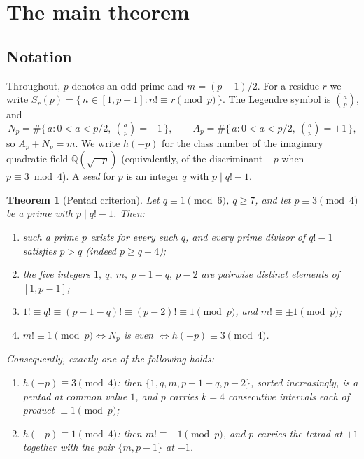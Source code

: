 \documentclass[11pt]{article}
\newtheorem{theorem}{Theorem}[section]
\theoremstyle{definition}
\theoremstyle{remark}
\newcommand{\Q}{\mathbb{Q}}
\newcommand{\legendre}[2]{\left(\tfrac{#1}{#2}\right)}
\begin{document}
\section{The main theorem}\label{sec:main}

\subsection*{Notation}
Throughout, $p$ denotes an odd prime and $m = (p-1)/2$. For a residue $r$ we
write $S_r(p) = \{\, n \in [1, p-1] : n! \equiv r \pmod p \,\}$. The Legendre
symbol is $\legendre{a}{p}$, and
\[
  N_p = \#\{\, a : 0 < a < p/2,\ \legendre{a}{p} = -1 \,\}, \qquad
  A_p = \#\{\, a : 0 < a < p/2,\ \legendre{a}{p} = +1 \,\},
\]
so $A_p + N_p = m$. We write $h(-p)$ for the class number of the imaginary
quadratic field $\Q(\sqrt{-p})$ (equivalently, of the discriminant $-p$ when
$p \equiv 3 \bmod 4$). A \emph{seed} for $p$ is an integer $q$ with
$p \mid q! - 1$.

\begin{theorem}[Pentad criterion]\label{thm:main}
Let $q \equiv 1 \pmod 6$, $q \ge 7$, and let $p \equiv 3 \pmod 4$ be a prime
with $p \mid q! - 1$. Then:
\begin{enumerate}
  \item[(a)] such a prime $p$ exists for every such $q$, and every prime
    divisor of $q!-1$ satisfies $p > q$ (indeed $p \ge q+4$);
  \item[(b)] the five integers $1,\ q,\ m,\ p-1-q,\ p-2$ are pairwise
    distinct elements of $[1, p-1]$;
  \item[(c)] $1! \equiv q! \equiv (p-1-q)! \equiv (p-2)! \equiv 1 \pmod p$,
    and $m! \equiv \pm 1 \pmod p$;
  \item[(d)] $m! \equiv 1 \pmod p \iff N_p$ is even $\iff h(-p) \equiv 3
    \pmod 4$.
\end{enumerate}
Consequently, exactly one of the following holds:
\begin{enumerate}
  \item[(i)] $h(-p) \equiv 3 \pmod 4$: then $\{1, q, m, p-1-q, p-2\}$,
    sorted increasingly, is a pentad at common value $1$, and $p$ carries
    $k = 4$ consecutive intervals each of product $\equiv 1 \pmod p$;
  \item[(ii)] $h(-p) \equiv 1 \pmod 4$: then $m! \equiv -1 \pmod p$, and $p$
    carries the tetrad at $+1$ together with the pair $\{m, p-1\}$ at $-1$.
\end{enumerate}
\end{theorem}
\end{document}
